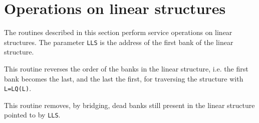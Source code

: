 \section{Operations on linear structures}
\par The routines described in this section perform service operations
on linear structures.
The parameter {\tt LLS} is the address of the first bank
of the linear structure.
\par This routine reverses the order of the banks in the linear structure,
i.e. the first bank becomes the last, and the last the first,
for traversing the structure with {\tt L=LQ(L)}.
\par This routine removes, by bridging, dead banks still present
in the linear structure pointed to by {\tt LLS}.
